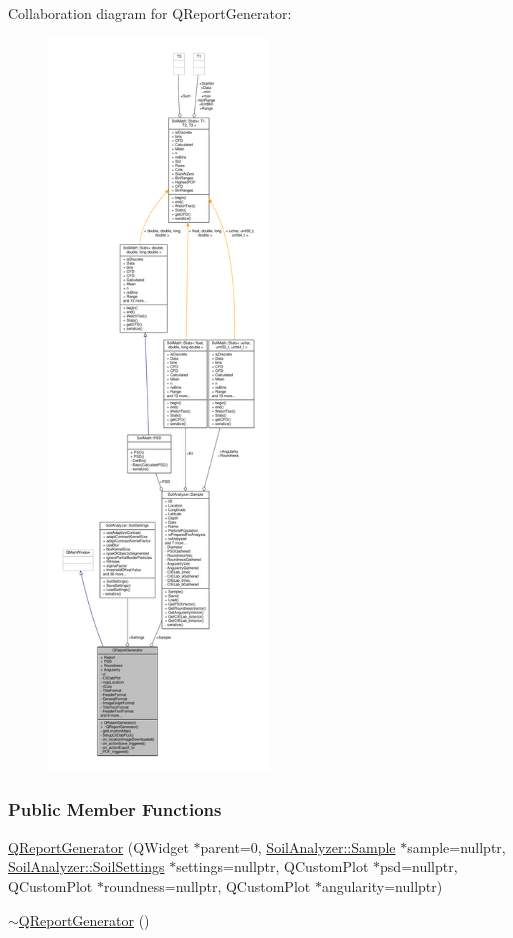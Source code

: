 Collaboration diagram for Q\+Report\+Generator\+:
\nopagebreak
\begin{figure}[H]
\begin{center}
\leavevmode
\includegraphics[height=550pt]{class_q_report_generator__coll__graph}
\end{center}
\end{figure}
\subsubsection*{Public Member Functions}
\begin{DoxyCompactItemize}
\item 
\hyperlink{class_q_report_generator_a3423584a1653cd7271a4d8526b2edf02}{Q\+Report\+Generator} (Q\+Widget $\ast$parent=0, \hyperlink{class_soil_analyzer_1_1_sample}{Soil\+Analyzer\+::\+Sample} $\ast$sample=nullptr, \hyperlink{class_soil_analyzer_1_1_soil_settings}{Soil\+Analyzer\+::\+Soil\+Settings} $\ast$settings=nullptr, Q\+Custom\+Plot $\ast$psd=nullptr, Q\+Custom\+Plot $\ast$roundness=nullptr, Q\+Custom\+Plot $\ast$angularity=nullptr)
\item 
\hyperlink{class_q_report_generator_a42ad110fb06f47767b6a94feb49f85c0}{$\sim$\+Q\+Report\+Generator} ()
\end{DoxyCompactItemize}
